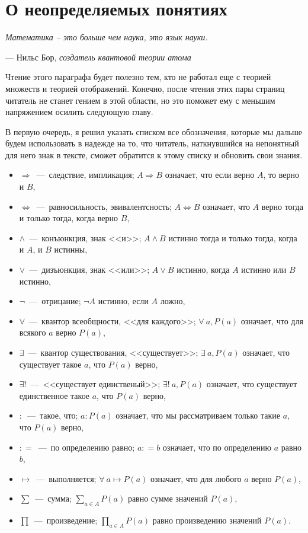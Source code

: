 \section{О неопределяемых понятиях}

\epigraph{\itshape Математика – это больше чем наука, это язык науки.}
{--- Нильс Бор, \textit{создатель квантовой теории атома}}

	Чтение этого параграфа будет полезно тем, кто не работал еще с теорией множеств и теорией отображений. Конечно, после чтения этих
	пары страниц читатель не станет гением в этой области, но это поможет ему с меньшим напряжением осилить следующую главу.


	В первую очередь, я решил указать списком все обозначения, которые мы дальше будем использовать в надежде на то, 
	что читатель, наткнувшийся на непонятный для него знак в тексте, сможет обратится к этому списку и обновить свои знания.
	
\begin{itemize}
\item $\Rightarrow$~---~следствие, импликация; $A \Rightarrow B$ означает, что если верно $A$, то верно и $B$,
\item $\Leftrightarrow$~---~равносильность, эвивалентсность; $A \Leftrightarrow B$ означает, что $A$ верно тогда и только тогда, когда верно $B$, 
\item $\wedge$~---~конъюнкция, знак <<и>>; $A \wedge B$ истинно тогда и только тогда, когда и $A$, и $B$ истинны,
\item $\vee$~---~дизъюнкция, знак <<или>>; $A \vee B$ истинно, когда $A$ истинно или $B$ истинно,
\item $\neg$~---~отрицание; $\neg A$ истинно, если $A$ ложно,
\item $\forall$~---~квантор всеобщности, <<для каждого>>; $\forall \!\ a, P(a)$ означает, что для всякого $a$ верно $P(a)$,
\item $\exists$~---~квантор существования, <<существует>>; $\exists \!\ a, P(a)$ означает, что существует такое $a$, что $P(a)$ верно,
\item $\exists!$~---~<<существует единственый>>; $\exists! \!\ a, P(a)$ означает, что существует единственное такое $a$, что $P(a)$ верно,
\item $\colon$~---~такое, что; $a: P(a)$ означает, что мы рассматриваем только такие $a$, что $P(a)$ верно,
\item $\colon=$~---~по определению равно; $a \colon = b$ означает, что по определению $a$ равно $b$,
\item $\mapsto$~---~выполняется; $\forall \!\ a \mapsto P(a)$ означает, что для любого $a$ верно $P(a)$,
\item $\displaystyle\sum$~---~сумма; $\displaystyle\sum_{a \in A} P(a)$ равно сумме значений $P(a)$,
\item $\displaystyle\prod$~---~произведение; $\displaystyle\prod_{a \in A} P(a)$ равно произведению значений $P(a)$.
\end{itemize}
	
